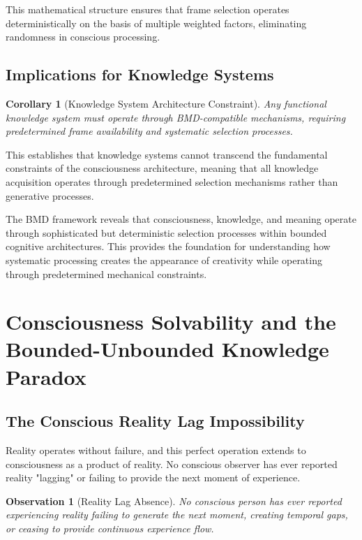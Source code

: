 \documentclass[12pt,a4paper]{article}
\newtheorem{corollary}[theorem]{Corollary}
\newtheorem{observation}[theorem]{Observation}
\begin{document}
This mathematical structure ensures that frame selection operates deterministically on the basis of multiple weighted factors, eliminating randomness in conscious processing.

\subsection{Implications for Knowledge Systems}

\begin{corollary}[Knowledge System Architecture Constraint]
Any functional knowledge system must operate through BMD-compatible mechanisms, requiring predetermined frame availability and systematic selection processes.
\end{corollary}

This establishes that knowledge systems cannot transcend the fundamental constraints of the consciousness architecture, meaning that all knowledge acquisition operates through predetermined selection mechanisms rather than generative processes.

The BMD framework reveals that consciousness, knowledge, and meaning operate through sophisticated but deterministic selection processes within bounded cognitive architectures. This provides the foundation for understanding how systematic processing creates the appearance of creativity while operating through predetermined mechanical constraints.

\section{Consciousness Solvability and the Bounded-Unbounded Knowledge Paradox}

\subsection{The Conscious Reality Lag Impossibility}

Reality operates without failure, and this perfect operation extends to consciousness as a product of reality. No conscious observer has ever reported reality "lagging" or failing to provide the next moment of experience.

\begin{observation}[Reality Lag Absence]
No conscious person has ever reported experiencing reality failing to generate the next moment, creating temporal gaps, or ceasing to provide continuous experience flow.
\end{observation}
\end{document}
